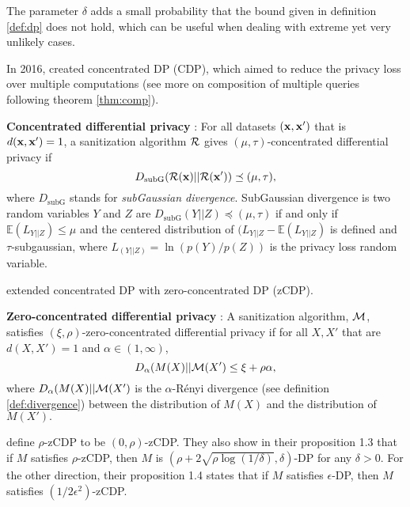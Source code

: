 The parameter $\delta$ adds a small probability that the bound given in definition \ref{def:dp} does not hold, which can be useful when dealing with extreme yet very unlikely cases.

In 2016, \citet{dwork2016concentrated} created concentrated DP (CDP), which aimed to reduce the privacy loss over multiple computations (see more on composition of multiple queries following theorem \ref{thm:comp}).

\begin{defn}\label{def:cdp} \textbf{Concentrated differential privacy} \citep{dwork2016concentrated}:
For all datasets $(\mathbf{x},\mathbf{x}')$ that is $d(\mathbf{x},\mathbf{x}')=1$, a sanitization algorithm $\mathcal{R}$ gives $(\mu, \tau)$-concentrated differential privacy if 
\begin{equation}
    D_{\text{subG}}(\mathcal{R}(\mathbf{x})||\mathcal{R}(\mathbf{x}')) \preceq (\mu,\tau),
\end{equation}
where $D_{\text{subG}}$ stands for \emph{subGaussian divergence}. SubGaussian divergence is two random variables $Y$ and $Z$ are $D_{\text{subG}}(Y||Z) \preceq (\mu,\tau)$ if and only if  $\mathbb{E}(L_{Y||Z})\leq \mu$ and the centered distribution of $(L_{Y||Z}-\mathbb{E}(L_{Y||Z})$ is defined and $\tau$-subgaussian, where  $L_{(Y||Z)}=\ln\left(p(Y) /p(Z) \right)$ is the privacy loss random variable.
\end{defn}

\citet{bun2016concentrated} extended concentrated DP with zero-concentrated DP (zCDP).

\begin{defn}\label{def:scdp} \textbf{Zero-concentrated differential privacy} \citep{bun2016concentrated}:
A sanitization algorithm, $\mathcal{M}$, satisfies $(\xi, \rho)$-zero-concentrated differential privacy if for all $X, X'$ that are $d(X,X')=1$ and $\alpha\in (1, \infty)$,
    \begin{equation}
        D_\alpha(M(X)||\mathcal{M}(X')\leq\xi+\rho\alpha,
    \end{equation}
    where $D_\alpha(M(X)||\mathcal{M}(X')$ is the $\alpha$-R\'enyi divergence (see definition \ref{def:divergence}) between the distribution of $M(X)$ and the distribution of $M(X').$
\end{defn}
\citet{bun2016concentrated} define $\rho$-zCDP to be $(0,\rho)$-zCDP. They also show in their proposition 1.3 that if $M$ satisfies $\rho$-zCDP, then $M$ is $(\rho+2\sqrt{\rho\log(1/\delta)},\delta)$-DP for any $\delta>0$. For the other direction, their proposition 1.4 states that if $M$ satisfies $\epsilon$-DP, then $M$ satisfies $(1/2\epsilon^2)$-zCDP.

